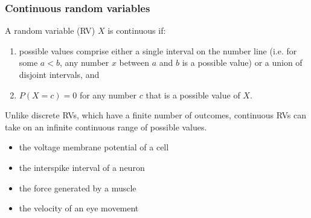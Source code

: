 \documentclass{beamer}
\begin{document}
\begin{frame}
\frametitle{Continuous random variables}

\begin{definition} 
A random variable (RV) $X$ is continuous if:
\begin{enumerate}
\item possible values comprise either a single interval on the number line (i.e. for some $a < b$, any number $x$ between $a$ and $b$ is a possible value) or a union of disjoint intervals, and
\item  $P(X = c) = 0$ for any number $c$ that is a possible value of $X$.
\end{enumerate}
\end{definition}

Unlike discrete RVs, which have a finite number of outcomes, continuous RVs can take on an infinite continuous range of possible values. %

\begin{examples}
\begin{itemize}
\item the voltage membrane potential of a cell
\item the interspike interval of a neuron
\item the force generated by a muscle
\item the velocity of an eye movement
\end{itemize}
\end{examples}


\end{frame}
\end{document}
